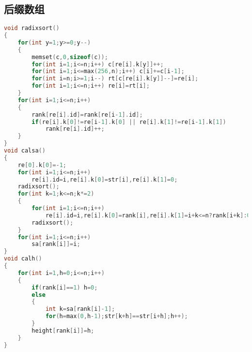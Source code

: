 \subsection{后缀数组}
    \begin{lstlisting}[language=c++]
void radixsort()
{
	for(int y=1;y>=0;y--)
	{
		memset(c,0,sizeof(c));
		for(int i=1;i<=n;i++) c[re[i].k[y]]++;
		for(int i=1;i<=max(256,n);i++) c[i]+=c[i-1];
		for(int i=n;i>=1;i--) rt[c[re[i].k[y]]--]=re[i];
		for(int i=1;i<=n;i++) re[i]=rt[i];	
	}	
	for(int i=1;i<=n;i++)
	{
		rank[re[i].id]=rank[re[i-1].id];
		if(re[i].k[0]!=re[i-1].k[0] || re[i].k[1]!=re[i-1].k[1])
			rank[re[i].id]++;	
	}
}
void calsa()
{
	re[0].k[0]=-1;
	for(int i=1;i<=n;i++)
		re[i].id=i,re[i].k[0]=str[i],re[i].k[1]=0;
	radixsort();
	for(int k=1;k<=n;k*=2)
	{
		for(int i=1;i<=n;i++)
			re[i].id=i,re[i].k[0]=rank[i],re[i].k[1]=i+k<=n?rank[i+k]:0;
		radixsort();	
	}	
	for(int i=1;i<=n;i++)
		sa[rank[i]]=i;
}
void calh()
{
	for(int i=1,h=0;i<=n;i++)
	{
		if(rank[i]==1) h=0;
		else 
		{
			int k=sa[rank[i]-1];
			for(h=max(0,h-1);str[k+h]==str[i+h];h++);	
		}	
		height[rank[i]]=h;
	}	
}
    \end{lstlisting}
